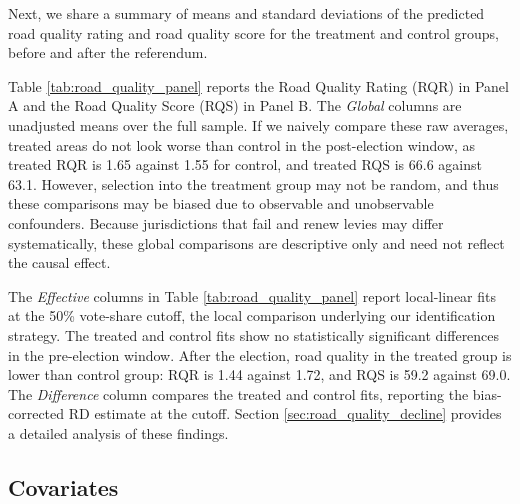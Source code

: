 Next, we share a summary of means and standard deviations of the predicted road quality rating and road quality score for the treatment and control groups, before and after the referendum.



Table \ref{tab:road_quality_panel} reports the Road Quality Rating (RQR) in Panel A and the Road Quality Score (RQS) in Panel B. The \textit{Global} columns are unadjusted means over the full sample. If we naively compare these raw averages, treated areas do not look worse than control in the post-election window, as treated RQR is 1.65 against 1.55 for control, and treated RQS is 66.6 against 63.1. However, selection into the treatment group may not be random, and thus these comparisons may be biased due to observable and unobservable confounders.
Because jurisdictions that fail and renew levies may differ systematically, these global comparisons are descriptive only and need not reflect the causal effect.

The \textit{Effective} columns in Table \ref{tab:road_quality_panel} report local-linear fits at the 50\% vote-share cutoff, the local comparison underlying our identification strategy. The treated and control fits show no statistically significant differences in the pre-election window. After the election, road quality in the treated group is lower than control group: RQR is 1.44 against 1.72, and RQS is 59.2 against 69.0. The \textit{Difference} column compares the treated and control fits, reporting the bias-corrected RD estimate at the cutoff.
Section \ref{sec:road_quality_decline} provides a detailed analysis of these findings.

























\subsection{Covariates}

